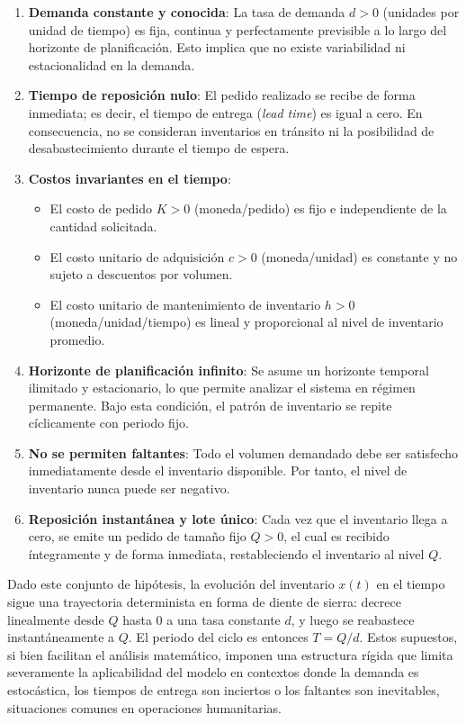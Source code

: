 \documentclass[
  spanish,
  us-letterpaper,
  DIV=11,
  numbers=noendperiod]{scrreprt}
\providecommand{\tightlist}{%
  \setlength{\itemsep}{0pt}\setlength{\parskip}{0pt}}
\numberwithin{equation}{section}
\begin{document}
\begin{enumerate}
\def\labelenumi{\arabic{enumi}.}
\item
  \textbf{Demanda constante y conocida}: La tasa de demanda \(d > 0\)
  (unidades por unidad de tiempo) es fija, continua y perfectamente
  previsible a lo largo del horizonte de planificación. Esto implica que
  no existe variabilidad ni estacionalidad en la demanda.
\item
  \textbf{Tiempo de reposición nulo}: El pedido realizado se recibe de
  forma inmediata; es decir, el tiempo de entrega (\emph{lead time}) es
  igual a cero. En consecuencia, no se consideran inventarios en
  tránsito ni la posibilidad de desabastecimiento durante el tiempo de
  espera.
\item
  \textbf{Costos invariantes en el tiempo}:

  \begin{itemize}
  \tightlist
  \item
    El costo de pedido \(K > 0\) (moneda/pedido) es fijo e independiente
    de la cantidad solicitada.\\
  \item
    El costo unitario de adquisición \(c > 0\) (moneda/unidad) es
    constante y no sujeto a descuentos por volumen.\\
  \item
    El costo unitario de mantenimiento de inventario \(h > 0\)
    (moneda/unidad/tiempo) es lineal y proporcional al nivel de
    inventario promedio.
  \end{itemize}
\item
  \textbf{Horizonte de planificación infinito}: Se asume un horizonte
  temporal ilimitado y estacionario, lo que permite analizar el sistema
  en régimen permanente. Bajo esta condición, el patrón de inventario se
  repite cíclicamente con periodo fijo.
\item
  \textbf{No se permiten faltantes}: Todo el volumen demandado debe ser
  satisfecho inmediatamente desde el inventario disponible. Por tanto,
  el nivel de inventario nunca puede ser negativo.
\item
  \textbf{Reposición instantánea y lote único}: Cada vez que el
  inventario llega a cero, se emite un pedido de tamaño fijo \(Q > 0\),
  el cual es recibido íntegramente y de forma inmediata, restableciendo
  el inventario al nivel \(Q\).
\end{enumerate}

Dado este conjunto de hipótesis, la evolución del inventario \(x(t)\) en
el tiempo sigue una trayectoria determinista en forma de diente de
sierra: decrece linealmente desde \(Q\) hasta \(0\) a una tasa constante
\(d\), y luego se reabastece instantáneamente a \(Q\). El periodo del
ciclo es entonces \(T = Q/d\). Estos supuestos, si bien facilitan el
análisis matemático, imponen una estructura rígida que limita
severamente la aplicabilidad del modelo en contextos donde la demanda es
estocástica, los tiempos de entrega son inciertos o los faltantes son
inevitables, situaciones comunes en operaciones humanitarias.
\end{document}
